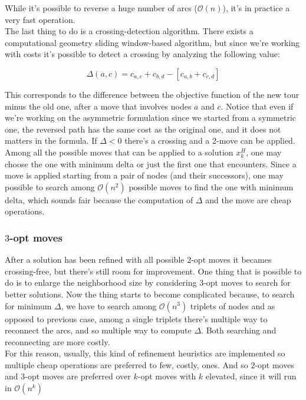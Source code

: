 While it's possible to reverse a huge number of arcs ($\mathcal{O}(n)$), it's in
practice a very fast operation.\\
The last thing to do is a crossing-detection algorithm. There exists a
computational geometry sliding window-based algorithm, but since we're working
with costs it's possible to detect a crossing by analyzing the following value:

\begin{equation}
    \Delta(a,c) = c_{a,c} + c_{b,d} - [c_{a,b} + c_{c,d}]
\end{equation}

This corresponds to the difference between the objective function of the new
tour minus the old one, after a move that involves nodes $a$ and $c$. Notice
that even if we're working on the asymmetric formulation since we started from
a symmetric one, the reversed path has the same cost as the original one, and it
does not matters in the formula. If $\Delta < 0$ there's a crossing and a $2$-move can
be applied.\\
Among all the possible moves that can be applied to a solution $x^H_k$, one
may choose the one with minimum delta or just the first one that encounters.
Since a move is applied starting from a pair of nodes (and their successors),
one may possible to search among $\mathcal{O}(n^2)$ possible moves to find the
one with minimum delta, which sounds fair because the computation of $\Delta$
and the move are cheap operations.

\subsubsection{$3$-opt moves}
After a solution has been refined with all possible $2$-opt moves it becames
crossing-free, but there's still room for improvement. One thing that is
possible to do is to enlarge the neighborhood size by considering $3$-opt moves to
search for better solutions.  Now the thing starts to become complicated
because, to search for minimum $\Delta$, we have to search among
$\mathcal{O}(n^3)$ triplets of nodes and as opposed to previous case, among a
single triplets there's multiple way to reconnect the arcs, and so multiple way
to compute $\Delta$. Both searching and reconnecting are more costly.\\ 
For this reason, usually, this kind of refinement heuristics are implemented so
multiple cheap operations are preferred to few, costly, ones. And so $2$-opt moves
and $3$-opt moves are preferred over $k$-opt moves with $k$ elevated, since it will run
in $\mathcal{O}(n^k)$

